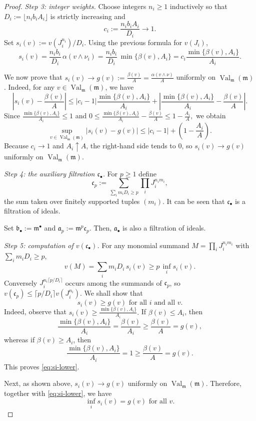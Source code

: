 \documentclass[12pt]{amsart}
\newcommand{\m}{\mathfrak m}
\renewcommand{\a}{\mathfrak{a}}
\renewcommand{\b}{\mathfrak{b}}
\newcommand{\fc}{\mathfrak{c}}
\DeclareMathOperator{\Val}{Val}
\newcommand{\abul}{{\a_\bullet}}
\newcommand{\bbul}{{\b_\bullet}}
\theoremstyle{plain}
\theoremstyle{definition}
\numberwithin{equation}{section}
\begin{document}
\begin{proof}
\smallskip
\noindent\textit{Step 3: integer weights.}
Choose integers $n_i\ge1$ inductively so that
$D_i:=\lfloor n_i b_i A_i\rfloor$ is strictly increasing and
\[
c_i := \frac{n_i b_i A_i}{D_i}\longrightarrow 1.
\]
Set $s_i(v):=v(J_i^{n_i})/D_i$. Using the previous formula for $v(J_i)$,
\[
s_i(v)=\frac{n_i b_i}{D_i}\,\alpha(v\wedge\nu_i)
      =\frac{n_i b_i}{D_i}\,\min\{\beta(v),A_i\}
      = c_i \frac{\min\{\beta(v),A_i\}}{A_i}.
\]

We now prove that $s_i(v)\to g(v) :=\frac{\beta(v)}{A}=\frac{\alpha(v\wedge\nu)}{A}$ uniformly on $\Val_{\m}(\m)$.
Indeed, for any $v\in\Val_{\m}(\m)$, we have
\[
\left|s_i(v)-\frac{\beta(v)}{A}\right|
\le
|c_i-1|\frac{\min\{\beta(v),A_i\}}{A_i}
+
\left|
\frac{\min\{\beta(v),A_i\}}{A_i}-\frac{\beta(v)}{A}
\right|.
\]
Since $\frac{\min\{\beta(v),A_i\}}{A_i}\le1$ and $0\le
\frac{\min\{\beta(v),A_i\}}{A_i}-\frac{\beta(v)}{A} \le 1-\frac{A_i}{A},$
we obtain
\[
\sup_{v\in\Val_{\m}(\m)}
\left|s_i(v)-g(v)\right|
\le
|c_i-1|+\left(1-\frac{A_i}{A}\right).
\]
Because $c_i\to1$ and $A_i\uparrow A$, the right-hand side tends to $0$,
so $s_i(v)\to g(v)$ uniformly on $\Val_{\m}(\m)$.

\smallskip
\noindent\textit{Step 4: the auxiliary filtration $\fc_\bullet$.}
For $p\ge1$ define
\[
\fc_p:=\sum_{\sum_i m_iD_i\ge p}\prod_i J_i^{n_i m_i},
\]
the sum taken over finitely supported tuples $(m_i)$.
It can be seen that $\fc_\bullet$ is a filtration of ideals.

Set $\bbul:=\m^\bullet$ and $\a_p:=\m^p\fc_p$.  
Then, $\abul$ is also a filtration of ideals.

\smallskip
\noindent\textit{Step 5: computation of $v(\fc_\bullet)$.}
For any monomial summand $M=\prod_iJ_i^{n_im_i}$ with $\sum_im_iD_i\ge p$,
\[
v(M)=\sum_im_iD_i\,s_i(v)\ge p\,\inf_i s_i(v).
\]
Conversely $J_i^{n_i\lceil p/D_i\rceil}$ occurs among the summands of
$\fc_p$, so
$v(\fc_p)\le\lceil p/D_i\rceil v(J_i^{n_i})$.  
We shall show that
\begin{equation}\label{eq:si-lower}
s_i(v)\ge g(v) \text{ for all }i \text{ and all }v.
\end{equation}
Indeed, observe that $s_i(v)\ge \frac{\min\{\beta(v),A_i\}}{A_i}.$
If $\beta(v)\le A_i$, then
\[
\frac{\min\{\beta(v),A_i\}}{A_i}=\frac{\beta(v)}{A_i}\ge \frac{\beta(v)}{A}=g(v),
\]
whereas if $\beta(v)\ge A_i$, then
\[
\frac{\min\{\beta(v),A_i\}}{A_i}=1\ge \frac{\beta(v)}{A}=g(v).
\]
This proves \eqref{eq:si-lower}.

Next, as shown above, $s_i(v)\longrightarrow g(v)$
uniformly on $\Val_{\m}(\m)$. Therefore, together with \eqref{eq:si-lower}, we have
\[
\inf_i s_i(v)=g(v) \text{ for all }v.
\]


\end{proof}
\end{document}
